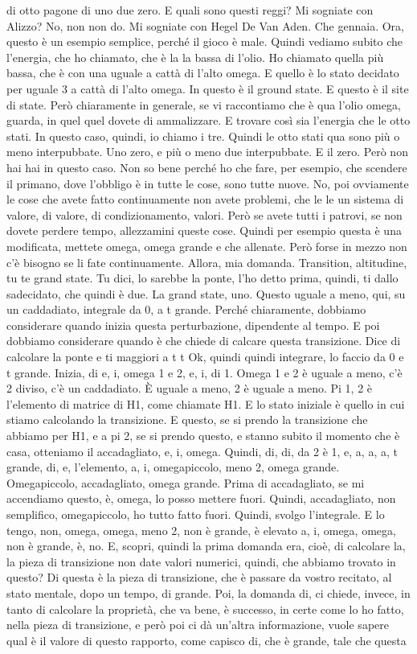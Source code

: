 \begin{soluzione}
{   di otto pagone di uno due zero. E quali sono questi reggi? Mi sogniate con Alizzo? No, non non do. Mi sogniate con Hegel De Van Aden. Che gennaia. Ora, questo è un esempio semplice, perché il gioco è male. Quindi vediamo subito che l'energia, che ho chiamato, che è la la bassa di l'olio. Ho chiamato quella più bassa, che è con una uguale a cattà di l'alto omega. E quello è lo stato decidato per uguale 3 a cattà di l'alto omega. In questo è il ground state. E questo è il site di state. Però chiaramente in generale, se vi raccontiamo che è qua l'olio omega, guarda, in quel quel dovete di ammalizzare. E trovare così sia l'energia che le otto stati. In questo caso, quindi, io chiamo i tre. Quindi le otto stati qua sono più o meno interpubbate. Uno zero, e più o meno due interpubbate. E il zero. Però non hai hai in questo caso. Non so bene perché ho che fare, per esempio, che scendere il primano, dove l'obbligo è in tutte le cose, sono tutte nuove. No, poi ovviamente le cose che avete fatto continuamente non avete problemi, che le le un sistema di valore, di valore, di condizionamento, valori. Però se avete tutti i patrovi, se non dovete perdere tempo, allezzamini queste cose. Quindi per esempio questa è una modificata, mettete omega, omega grande e che allenate. Però forse in mezzo non c'è bisogno se li fate continuamente. Allora, mia domanda. Transition, altitudine, tu te grand state. Tu dici, lo sarebbe la ponte, l'ho detto prima, quindi, ti dallo sadecidato, che quindi è due. La grand state, uno. Questo uguale a meno, qui, su un caddadiato, integrale da 0, a t grande. Perché chiaramente, dobbiamo considerare quando inizia questa perturbazione, dipendente al tempo. E poi dobbiamo considerare quando è che chiede di calcare questa transizione. Dice di calcolare la ponte e ti maggiori a t t Ok, quindi quindi integrare, lo faccio da 0 e t grande. Inizia, di e, i, omega 1 e 2, e, i, di 1. Omega 1 e 2 è uguale a meno, c'è 2 diviso, c'è un caddadiato. È uguale a meno, 2 è uguale a meno. Pi 1, 2 è l'elemento di matrice di H1, come chiamate H1. E lo stato iniziale è quello in cui stiamo calcolando la transizione. E questo, se si prendo la transizione che abbiamo per H1, e a pi 2, se si prendo questo, e stanno subito il momento che è casa, otteniamo il accadagliato, e, i, omega. Quindi, di, di, da 2 è 1, e, a, a, a, t grande, di, e, l'elemento, a, i, omegapiccolo, meno 2, omega grande. Omegapiccolo, accadagliato, omega grande. Prima di accadagliato, se mi accendiamo questo, è, omega, lo posso mettere fuori. Quindi, accadagliato, non semplifico, omegapiccolo, ho tutto fatto fuori. Quindi, svolgo l'integrale. E lo tengo, non, omega, omega, meno 2, non è grande, è elevato a, i, omega, omega, non è grande, è, no. E, scopri, quindi la prima domanda era, cioè, di calcolare la, la pieza di transizione non date valori numerici, quindi, che abbiamo trovato in questo? Di questa è la pieza di transizione, che è passare da vostro recitato, al stato mentale, dopo un tempo, di grande. Poi, la domanda di, ci chiede, invece, in tanto di calcolare la proprietà, che va bene, è successo, in certe come lo ho fatto, nella pieza di transizione, e però poi ci dà un'altra informazione, vuole sapere qual è il valore di questo rapporto, come capisco di, che è grande, tale che questa }
\end{soluzione}
